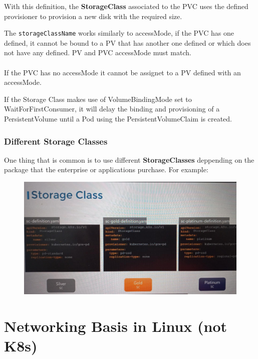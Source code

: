 \documentclass{article}
\newenvironment{blocktemplateIII}[1]{%
    \tcolorbox[beamer,%
    noparskip,breakable,
    ,colframe=Red,%
    colbacklower=LimeGreen!75!LightGreen,%
    title=#1]}%
    {\endtcolorbox}
\begin{document}
With this definition, the \textbf{StorageClass} associated to the PVC uses the defined provisioner to provision a new disk with the required size.

\begin{blocktemplateIII}{WARNING}
The \verb|storageClassName| works similarly to accessMode, if the PVC has one defined, it cannot be bound to a PV that has another one defined or which does not have any defined. PV and PVC accessMode must match. 
\\\\
If the PVC has no accessMode it cannot be assignet to a PV defined with an accessMode.
\end{blocktemplateIII}

\begin{blocktemplateIII}{WARNING}
If the Storage Class makes use of VolumeBindingMode set to WaitForFirstConsumer, it will delay the binding and provisioning of a PersistentVolume until a Pod using the PersistentVolumeClaim is created.
\end{blocktemplateIII}

\subsubsection{Different Storage Classes}
One thing that is common is to use different \textbf{StorageClasses} deppending on the package that the enterprise or applications purchase. For example:

\begin{figure}[H]
    \includegraphics[width=\textwidth]{pictures/stcl.png}
\end{figure}

\newpage
\section{Networking Basis in Linux (not K8s)}
\end{document}
